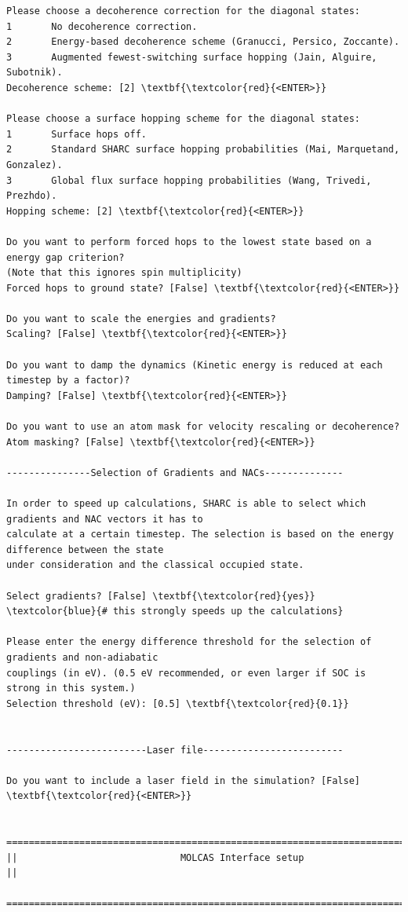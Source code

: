 \documentclass[a4paper,11pt,DIV=15,openany]{scrbook}
\begin{document}
\begin{oframed}
\begin{Verbatim}[commandchars=\\\{\}]
Please choose a decoherence correction for the diagonal states:
1       No decoherence correction.
2       Energy-based decoherence scheme (Granucci, Persico, Zoccante).
3       Augmented fewest-switching surface hopping (Jain, Alguire, Subotnik).
Decoherence scheme: [2] \textbf{\textcolor{red}{<ENTER>}}

Please choose a surface hopping scheme for the diagonal states:
1       Surface hops off.
2       Standard SHARC surface hopping probabilities (Mai, Marquetand, Gonzalez).
3       Global flux surface hopping probabilities (Wang, Trivedi, Prezhdo).
Hopping scheme: [2] \textbf{\textcolor{red}{<ENTER>}}

Do you want to perform forced hops to the lowest state based on a energy gap criterion?
(Note that this ignores spin multiplicity)
Forced hops to ground state? [False] \textbf{\textcolor{red}{<ENTER>}}

Do you want to scale the energies and gradients?
Scaling? [False] \textbf{\textcolor{red}{<ENTER>}}

Do you want to damp the dynamics (Kinetic energy is reduced at each timestep by a factor)?
Damping? [False] \textbf{\textcolor{red}{<ENTER>}}

Do you want to use an atom mask for velocity rescaling or decoherence?
Atom masking? [False] \textbf{\textcolor{red}{<ENTER>}}

---------------Selection of Gradients and NACs--------------

In order to speed up calculations, SHARC is able to select which gradients and NAC vectors it has to 
calculate at a certain timestep. The selection is based on the energy difference between the state 
under consideration and the classical occupied state.

Select gradients? [False] \textbf{\textcolor{red}{yes}}    \textcolor{blue}{# this strongly speeds up the calculations}

Please enter the energy difference threshold for the selection of gradients and non-adiabatic 
couplings (in eV). (0.5 eV recommended, or even larger if SOC is strong in this system.)
Selection threshold (eV): [0.5] \textbf{\textcolor{red}{0.1}}


-------------------------Laser file-------------------------

Do you want to include a laser field in the simulation? [False] \textbf{\textcolor{red}{<ENTER>}}

  ================================================================================
||                             MOLCAS Interface setup                             ||
  ================================================================================



\end{Verbatim}
\end{oframed}
\end{document}

